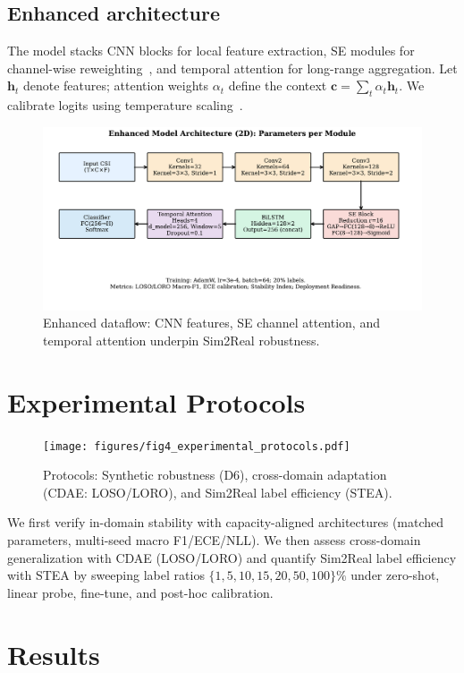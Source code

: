 \documentclass[journal]{IEEEtran}
\begin{document}
\subsection{Enhanced architecture}
The model stacks CNN blocks for local feature extraction, SE modules for channel-wise reweighting~\cite{se_networks2018}, and temporal attention for long-range aggregation. Let $\mathbf{h}_t$ denote features; attention weights $\alpha_t$ define the context $\mathbf{c}{=}\sum_t \alpha_t \mathbf{h}_t$. We calibrate logits using temperature scaling~\cite{calibration_guo2017}.

\begin{figure}[t]
\centering
\includegraphics[width=\columnwidth]{figures/fig3_enhanced_model_dataflow.pdf}
\caption{Enhanced dataflow: CNN features, SE channel attention, and temporal attention underpin Sim2Real robustness.}
\label{fig:enhanced}
\end{figure}

\section{Experimental Protocols}
\begin{figure}[t]
\centering
\texttt{[image: figures/fig4\_experimental\_protocols.pdf]}
\caption{Protocols: Synthetic robustness (D6), cross-domain adaptation (CDAE: LOSO/LORO), and Sim2Real label efficiency (STEA).}
\label{fig:protocols}
\end{figure}
We first verify in-domain stability with capacity-aligned architectures (matched parameters, multi-seed macro F1/ECE/NLL). We then assess cross-domain generalization with CDAE (LOSO/LORO) and quantify Sim2Real label efficiency with STEA by sweeping label ratios $\{1,5,10,15,20,50,100\}\%$ under zero-shot, linear probe, fine-tune, and post-hoc calibration.

\section{Results}
\end{document}
